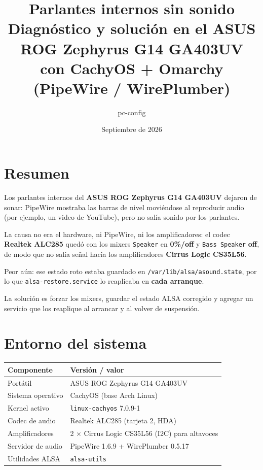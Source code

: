 \documentclass[12pt,a4paper]{article}
\title{%
  \textbf{Parlantes internos sin sonido}\\[0.4em]
  \large Diagnóstico y solución en el ASUS ROG Zephyrus G14 GA403UV\\
  con CachyOS + Omarchy (PipeWire / WirePlumber)
}
\author{pc-config}
\date{Septiembre de 2026}
\begin{document}
\maketitle
\tableofcontents
\newpage

\section{Resumen}

Los parlantes internos del \textbf{ASUS ROG Zephyrus G14 GA403UV} dejaron de
sonar: PipeWire mostraba las barras de nivel moviéndose al reproducir audio
(por ejemplo, un video de YouTube), pero no salía sonido por los parlantes.

La causa no era el hardware, ni PipeWire, ni los amplificadores: el codec
\textbf{Realtek ALC285} quedó con los mixers \texttt{Speaker} en \textbf{0\%/off}
y \texttt{Bass Speaker} \textbf{off}, de modo que no salía señal hacia los
amplificadores \textbf{Cirrus Logic CS35L56}.

Peor aún: ese estado roto estaba guardado en
\texttt{/var/lib/alsa/asound.state}, por lo que
\texttt{alsa-restore.service} lo reaplicaba en \textbf{cada arranque}.

La solución es forzar los mixers, guardar el estado ALSA corregido y agregar un
servicio que los reaplique al arrancar y al volver de suspensión.

\section{Entorno del sistema}

\begin{center}
\begin{tabular}{ll}
  \toprule
  Componente & Versión / valor \\
  \midrule
  Portátil            & ASUS ROG Zephyrus G14 GA403UV \\
  Sistema operativo   & CachyOS (base Arch Linux) \\
  Kernel activo       & \texttt{linux-cachyos} 7.0.9-1 \\
  Codec de audio      & Realtek ALC285 (tarjeta 2, HDA) \\
  Amplificadores      & 2 × Cirrus Logic CS35L56 (I2C) para altavoces \\
  Servidor de audio   & PipeWire 1.6.9 + WirePlumber 0.5.17 \\
  Utilidades ALSA     & \texttt{alsa-utils} \\
  \bottomrule
\end{tabular}
\end{center}
\end{document}
